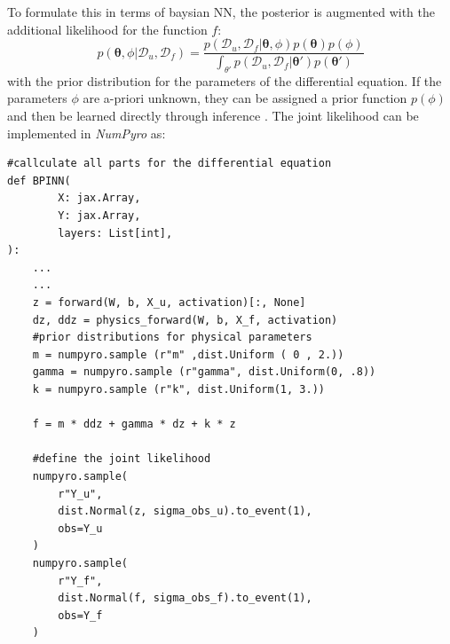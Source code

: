 \documentclass{article}
\begin{document}
To formulate this in terms of baysian NN, the posterior is augmented with the additional likelihood for the function $f$:
\begin{equation} \label{eq:post_params_BPINN}
    p(\bm \theta, \phi|\mathcal{D}_u, \mathcal{D}_f) = \frac{p(\mathcal{D}_u, \mathcal{D}_f|\bm \theta, \phi)p(\bm \theta)p(\phi)}{\int_{\theta'}p(\mathcal{D}_u, \mathcal{D}_f|\bm \theta')p(\bm \theta')}
\end{equation}
with the prior distribution for the parameters of the differential equation. If the parameters $\phi$ are a-priori unknown, they can be assigned a prior function $p(\phi)$ and then be learned directly through inference \cite{raissi2017physicsIDL, Yang_2021}.
The joint likelihood can be implemented in \textit{NumPyro} as:
\begin{lstlisting}[caption={Joint likelihood for B-PINN},captionpos=t]
#callculate all parts for the differential equation
def BPINN(
        X: jax.Array,
        Y: jax.Array,
        layers: List[int],
):
    ...
    ...
    z = forward(W, b, X_u, activation)[:, None]
    dz, ddz = physics_forward(W, b, X_f, activation)
    #prior distributions for physical parameters
    m = numpyro.sample (r"m" ,dist.Uniform ( 0 , 2.))
    gamma = numpyro.sample (r"gamma", dist.Uniform(0, .8))
    k = numpyro.sample (r"k", dist.Uniform(1, 3.))
        
    f = m * ddz + gamma * dz + k * z
    
    #define the joint likelihood
    numpyro.sample(
        r"Y_u", 
        dist.Normal(z, sigma_obs_u).to_event(1), 
        obs=Y_u
    )
    numpyro.sample(
        r"Y_f", 
        dist.Normal(f, sigma_obs_f).to_event(1), 
        obs=Y_f
    )
\end{lstlisting} 
\end{document}
